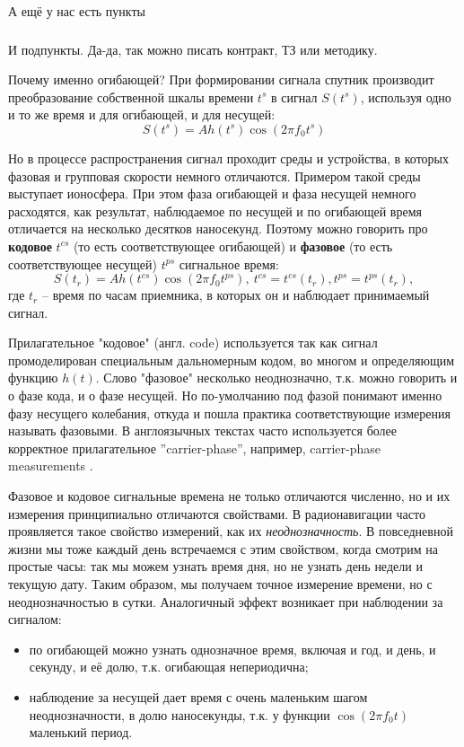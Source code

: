 \paragraph{}А ещё у нас есть пункты

\subparagraph{}И подпункты. Да-да, так можно писать контракт, ТЗ или методику.

Почему именно огибающей? 
При формировании сигнала спутник производит преобразование собственной шкалы времени $t^s$ в сигнал $S(t^s)$, используя одно и то же время и для огибающей, и для несущей:
\begin{equation}
S(t^s) = A h(t^{s}) \cos(2\pi f_0 t^s) 
\end{equation}

Но в процессе распространения сигнал проходит среды и устройства, в которых фазовая и групповая скорости немного отличаются.
Примером такой среды выступает ионосфера. 
При этом фаза огибающей и фаза несущей немного расходятся, как результат, наблюдаемое по несущей и по огибающей время отличается на несколько десятков наносекунд. 
Поэтому можно говорить про \textbf{кодовое} $t^{cs}$ (то есть соответствующее огибающей) и \textbf{фазовое} (то есть соответствующее несущей) $t^{ps}$ сигнальное время:
\begin{equation}
S\left(t_r\right) = A h\left(t^{cs}\right) \cos\left(2\pi f_0 t^{ps}\right),\   t^{cs}=t^{cs}\left(t_{r}\right), t^{ps}=t^{ps}\left(t_{r}\right),
\end{equation}
\noindent где $t_r$ -- время по часам приемника, в которых он и наблюдает принимаемый сигнал. 

Прилагательное "кодовое" (англ. code) используется так как сигнал промоделирован специальным дальномерным кодом, во многом и определяющим функцию $h(t)$. 
Слово "фазовое" несколько неоднозначно, т.к. можно говорить и о фазе кода, и о фазе несущей.
Но по-умолчанию под фазой понимают именно фазу несущего колебания, откуда и пошла практика соответствующие измерения называть фазовыми. 
В англоязычных текстах часто используется более корректное прилагательное ''carrier-phase'', например, carrier-phase measurements \cite[стр. 8, 11]{rinex303_update1}.

Фазовое и кодовое сигнальные времена не только отличаются численно, но и их измерения принципиально отличаются свойствами.
В радионавигации часто проявляется такое свойство измерений, как их \textit{неоднозначность}.
В повседневной жизни мы тоже каждый день встречаемся с этим свойством, когда смотрим на простые часы: так мы можем узнать время дня, но не узнать день недели и текущую дату.
Таким образом, мы получаем точное измерение времени, но с неоднозначностью в сутки. 
Аналогичный эффект возникает при наблюдении за сигналом: 
\begin{itemize}
\item по огибающей можно узнать однозначное время, включая и год, и день, и секунду, и её долю, т.к. огибающая непериодична;
\item наблюдение за несущей дает время с очень маленьким шагом неоднозначности, в долю наносекунды, т.к. у функции $\cos(2 \pi f_0 t)$ маленький период.
\end{itemize}


